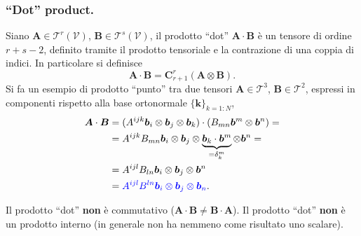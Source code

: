  \subsubsection{``Dot'' product.} Siano $\bm{A} \in \mathcal{T}^r(\mathcal{V})$, $\bm{B} \in \mathcal{T}^s(\mathcal{V})$, il
 prodotto ``dot'' $\bm{A} \cdot \bm{B}$ è un tensore di ordine $r+s-2$, definito tramite il prodotto tensoriale e la contrazione di una coppia di indici.
 In particolare si definisce 
 \begin{equation}
  \bm{A} \cdot \bm{B} = \bm{C}^{r}_{r+1} (\bm{A} \otimes \bm{B}) .
 \end{equation}
Si fa un esempio di prodotto ``punto'' tra due tensori $\bm{A} \in \mathcal{T}^3$, $\bm{B} \in \mathcal{T}^2$, espressi in componenti rispetto alla base ortonormale $\{\bm{k}\}_{k=1:N}$,
 \begin{equation}
 \begin{aligned}
  \bm{A} \cdot \bm{B} & = (A^{ijk} \bm{b}_i \otimes \bm{b}_j \otimes \bm{b}_k) \cdot (B_{mn} \bm{b}^m \otimes \bm{b}^n) = \\
     & = A^{ijk} B_{mn} \bm{b}_i \otimes \bm{b}_j \otimes \underbrace{\bm{b}_k \cdot \bm{b}^m}_{=\delta^m_k} \otimes \bm{b}^n = \\
   & = A^{ijl} B_{ln} \bm{b}_i \otimes \bm{b}_j \otimes \bm{b}^n \\
   & = {\color{blue} A^{ijl} B^{ln} \bm{b}_i \otimes \bm{b}_j \otimes \bm{b}_n} .
 \end{aligned}
 \end{equation}
%
\begin{remark}
 Il prodotto ``dot'' \textbf{non} è commutativo ($\bm{A} \cdot \bm{B} \neq \bm{B} \cdot \bm{A}$).
 Il prodotto ``dot'' \textbf{non} è un prodotto interno (in generale non ha nemmeno come risultato uno scalare).
\end{remark}
 
